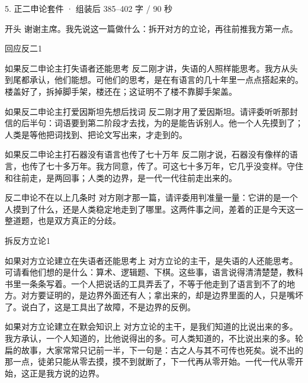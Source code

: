 \documentclass[script,pro]{debate}
\begin{document}
\begin{kit}{5. 正二申论}{套件 · 组装后 385–402 字 / 90 秒}
\begin{fixed}{开头}
谢谢主席。我先说这一篇做什么：拆开对方的立论，再往前推我方第一点。
\end{fixed}
\begin{pick}{回应反二}{1}
\begin{module}{如果反二申论主打失语者还能思考}
反二刚才讲，失语的人照样能思考。我方从头到尾都承认，他们能想。可他们的思考，是在有语言的几十年里一点点搭起来的。楼盖好了，拆掉脚手架，楼还在；这证明不了楼不靠脚手架盖。
\end{module}
\begin{module}{如果反二申论主打爱因斯坦先想后找词}
反二刚才用了爱因斯坦。请评委听听那封信的后半句：词语要到第二阶段才去找，为的是能告诉别人。他一个人先摸到了；人类是等他把词找到、把论文写出来，才走到的。
\end{module}
\begin{module}{如果反二申论主打石器没有语言也传了七十万年}
反二刚才说，石器没有像样的语言，也传了七十多万年。我方同意，传了。可这七十多万年，它几乎没变样。守住和往前走，是两回事；人类的边界，是一代一代往前走出来的。
\end{module}
\begin{fallback}{反二申论不在以上几条时}
对方刚才那一篇，请评委用判准量一量：它讲的是一个人摸到了什么，还是人类稳定地走到了哪里。这两件事之间，差着的正是今天这一整道题，也是双方真正的分歧。
\end{fallback}
\end{pick}
\begin{pick}{拆反方立论}{1}
\begin{module}{如果对方立论建立在失语者还能思考上}
对方立论的主干，是失语的人还能思考。可请看他们想的是什么：算术、逻辑题、下棋。这些事，语言说得清清楚楚，教科书里一条条写着。一个人把说话的工具弄丢了，不等于他走到了语言到不了的地方。对方要证明的，是边界外面还有人；拿出来的，却是边界里面的人，只是嘴坏了。说白了，这是工具出了故障，不是边界的反例。
\end{module}
\begin{module}{如果对方立论建立在默会知识上}
对方立论的主干，是我们知道的比说出来的多。我方承认，一个人知道的，比他说得出的多。可人类知道的，不比说出来的多。轮扁的故事，大家常常只记前一半，下一句是：古之人与其不可传也死矣。说不出的那一点，徒弟只能从零去摸，摸不到就断了，下一代再从零开始。一代一代从零开始，这正是我方说的边界。
\end{module}

\end{pick}
\end{kit}
\end{document}
